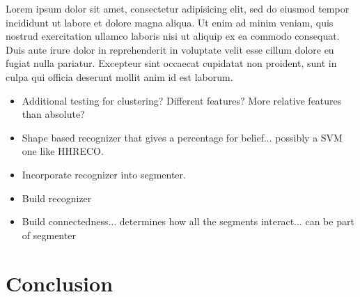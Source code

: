 \documentclass[10pt]{acmsiggraph}               %
\begin{document}
Lorem ipsum dolor sit amet, consectetur adipisicing elit, sed do eiusmod tempor incididunt ut labore et dolore magna aliqua. Ut enim ad minim veniam, quis nostrud exercitation ullamco laboris nisi ut aliquip ex ea commodo consequat. Duis aute irure dolor in reprehenderit in voluptate velit esse cillum dolore eu fugiat nulla pariatur. Excepteur sint occaecat cupidatat non proident, sunt in culpa qui officia deserunt mollit anim id est laborum.

\begin{itemize}
\item Additional testing for clustering? Different features? More relative features than absolute?
\item Shape based recognizer that gives a percentage for belief... possibly a SVM one like HHRECO.
\item Incorporate recognizer into segmenter.
\item Build recognizer
\item Build connectedness... determines how all the segments interact... can be part of segmenter
\end{itemize}

\section{Conclusion}



\nocite{*}

\end{document}
